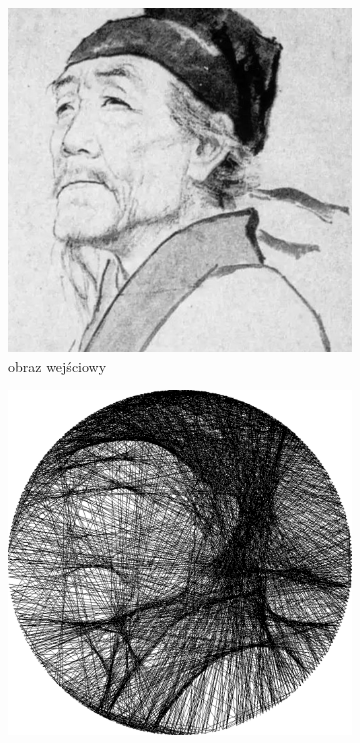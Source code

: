 \documentclass[a4paper, 12pt, polish, twoside]{extreport}
\begin{document}
	\begin{figure}[H] 
    \centering
    \begin{subfigure}{0.24\textwidth}
        \centering
        \includegraphics[width = \textwidth]{img/6-comp/dufu_original_c10_inv0.png}
        \caption{obraz wejściowy}
        \label{comp-comp-dufu-gogh-a}
    \end{subfigure}
    \begin{subfigure}{0.24\textwidth}
        \centering
        \includegraphics[width = \textwidth]{img/6-comp/dufu_xiaonan_.png}

\end{subfigure}
\end{figure}
\end{document}
